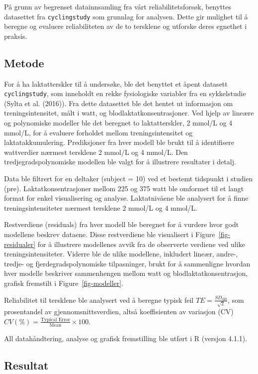 \documentclass[
  letterpaper,
  DIV=11,
  numbers=noendperiod]{scrreprt}
\begin{document}
På grunn av begrenset datainnsamling fra vårt reliabilitetsforsøk,
benyttes datasettet fra \texttt{cyclingstudy} som grunnlag for analysen.
Dette gir mulighet til å beregne og evaluere reliabiliteten av de to
tersklene og utforske deres egnethet i praksis.

\subsection{Metode}\label{metode-1}

For å ha laktatterskler til å undersøke, ble det benyttet et åpent
datasett \texttt{cyclingstudy}, som inneholdt en rekke fysiologiske
variabler fra en sykkelstudie (Sylta et al. (2016)). Fra dette
datasettet ble det hentet ut informasjon om treningsintensitet, målt i
watt, og blodlaktatkonsentrasjoner. Ved hjelp av lineære og polynomiske
modeller ble det beregnet to laktatterskler, 2 mmol/L og 4 mmol/L, for å
evaluere forholdet mellom treningsintensitet og laktatakkumulering.
Prediksjoner fra hver modell ble brukt til å identifisere wattverdier
nærmest tersklene 2 mmol/L og 4 mmol/L. Den tredjegradspolynomiske
modellen ble valgt for å illustrere resultater i detalj.

Data ble filtrert for en deltaker (subject = 10) ved et bestemt
tidspunkt i studien (pre). Laktatkonsentrasjoner mellom 225 og 375 watt
ble omformet til et langt format for enkel visualisering og analyse.
Laktatnivåene ble analysert for å finne treningsintensiteter nærmest
tersklene 2 mmol/L og 4 mmol/L.

Restverdiene (residuals) fra hver modell ble beregnet for å vurdere hvor
godt modellene beskrev dataene. Disse restverdiene ble visualisert i
Figure~\ref{fig-residualer} for å illustrere modellenes avvik fra de
observerte verdiene ved ulike treningsintensiteter. Viderre ble de ulike
modellene, inkludert lineær, andre-, tredje- og fjerdegradspolynomiske
tilpasninger, brukt for å sammenligne hvordan hver modelle beskriver
sammenhengen mellom watt og blodlaktatkonsentrasjon, grafisk fremstilt i
Figure~\ref{fig-modeller}.

Reliabilitet til tersklene ble analysert ved å beregne typisk feil
\(TE = \frac{SD_{\text{diff}}}{\sqrt{2}}\), som prosentandel av
gjennomsnittsverdien, altså koeffisienten av variasjon (CV)
\(CV (\%) = \frac{\text{Typical Error}}{\text{Mean}}\times 100\).

All datahåndtering, analyse og grafisk fremstilling ble utført i R
(versjon 4.1.1).

\subsection{Resultat}\label{resultat-1}
\end{document}
